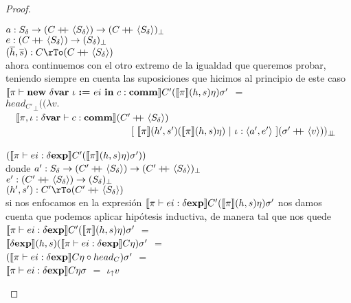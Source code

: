 \begin{proof}
\begin{itemize}
\begin{itemize}
$a : S_\delta \rightarrow 
(C +\kern-1.3ex+\kern0.8ex \langle S_\delta \rangle) \rightarrow (C +\kern-1.3ex+\kern0.8ex \langle S_\delta \rangle)_{\bot}$\\
$e : (C +\kern-1.3ex+\kern0.8ex \langle S_\delta \rangle) \rightarrow (S_\delta)_{\bot}$\\
$(\hover,\sover) : C \rTo (C \concat \lrangles{S_\delta})$\\

ahora continuemos con el otro extremo de la igualdad que queremos probar, teniendo 
siempre en cuenta las suposiciones que hicimos al principio de este caso\\

$\llbracket \pi \vdash \textbf{new} \ \delta \textbf{var} \ \iota \ \textbf{:=} \ ei \ \textbf{in} \ c : \textbf{comm} \rrbracket C'(\llbracket \pi \rrbracket(h,s)\eta)\sigma'$ $=$\\
${head_{C'}}_{\bot} ((\lambda v .$ \\
\indent \ \ 
	$\llbracket \pi,\iota:\delta \textbf{var} \vdash c : \textbf{comm} \rrbracket(C' +\kern-1.3ex+\kern0.8ex \langle S_\delta \rangle)$\\
\indent \ \ \ \ \ \ \ \ \ \ \ \ \ \ \ \ \ \ \ \ \ \ \ \ \ \
			$[ \ \semBrcks{\pi}(h',s')(\semBrcks{\pi}(h,s)\eta) \ | \ \iota:\lrangles{a',e'} \ ]
			(\sigma' \concat \lrangles{v}))_{\dbot}$\\
\indent \ \ \ \ \ \ \ \ \ \ \ \ \ \ \ \ \ \ \ \ \ \ \ \ \ \ \ \ \ \ \ \ \ \ \ \ \ \ \ \ \ \ \ \ \
 \ \ \ \ \ \ \ \ \ \ \ \ \ \ \ \ \ \ \
	$(\llbracket \pi \vdash ei : \delta \textbf{exp} \rrbracket C'(\llbracket \pi \rrbracket(h,s)\eta)\sigma'))$\\
	
donde $a' : S_\delta \rightarrow (C' +\kern-1.3ex+\kern0.8ex \langle S_\delta \rangle) 
			\rightarrow (C' +\kern-1.3ex+\kern0.8ex \langle S_\delta \rangle)_{\bot}$\\
$e' : (C' +\kern-1.3ex+\kern0.8ex \langle S_\delta \rangle) \rightarrow (S_\delta)_\bot$\\
$(h',s') : C' \rTo (C' \concat \lrangles{S_\delta})$\\

si nos enfocamos en la expresi\'on 
$\llbracket \pi \vdash ei : \delta \textbf{exp} \rrbracket C'(\llbracket \pi \rrbracket(h,s)\eta)\sigma'$ nos damos cuenta
que podemos aplicar hip\'otesis inductiva, de manera tal que nos quede\\

$\llbracket \pi \vdash ei : \delta \textbf{exp} \rrbracket C'(\llbracket \pi \rrbracket(h,s)\eta)\sigma'$ $=$\\
$\llbracket \delta \textbf{exp} \rrbracket(h,s)(\llbracket \pi \vdash ei : \delta \textbf{exp} \rrbracket C\eta)\sigma'$ $=$\\
$(\llbracket \pi \vdash ei : \delta \textbf{exp} \rrbracket C\eta \circ head_C) \sigma'$ $=$\\
$\llbracket \pi \vdash ei : \delta \textbf{exp} \rrbracket C\eta\sigma$ $=$ $\iota_{\uparrow} v$\\


\end{itemize}
\end{itemize}
\end{proof}
